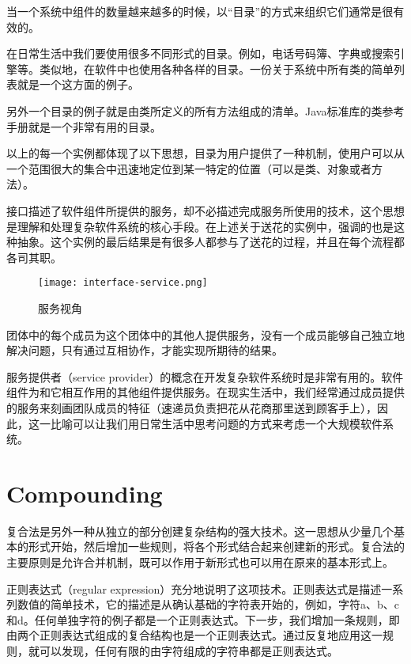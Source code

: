 当一个系统中组件的数量越来越多的时候，以“目录”的方式来组织它们通常是很有效的。

在日常生活中我们要使用很多不同形式的目录。例如，电话号码簿、字典或搜索引擎等。类似地，在软件中也使用各种各样的目录。一份关于系统中所有类的简单列表就是一个这方面的例子。

另外一个目录的例子就是由类所定义的所有方法组成的清单。Java标准库的类参考手册就是一个非常有用的目录。

以上的每一个实例都体现了以下思想，目录为用户提供了一种机制，使用户可以从一个范围很大的集合中迅速地定位到某一特定的位置（可以是类、对象或者方法）。


接口描述了软件组件所提供的服务，却不必描述完成服务所使用的技术，这个思想是理解和处理复杂软件系统的核心手段。在上述关于送花的实例中，强调的也是这种抽象。这个实例的最后结果是有很多人都参与了送花的过程，并且在每个流程都各司其职。

\begin{figure}[htbp]
\centering
\texttt{[image: interface-service.png]}
\caption{服务视角}
\label{fig:interface-service}
\end{figure}


团体中的每个成员为这个团体中的其他人提供服务，没有一个成员能够自己独立地解决问题，只有通过互相协作，才能实现所期待的结果。


服务提供者（service provider）的概念在开发复杂软件系统时是非常有用的。软件组件为和它相互作用的其他组件提供服务。在现实生活中，我们经常通过成员提供的服务来刻画团队成员的特征（速递员负责把花从花商那里送到顾客手上），因此，这一比喻可以让我们用日常生活中思考问题的方式来考虑一个大规模软件系统。



\section{Compounding}


复合法是另外一种从独立的部分创建复杂结构的强大技术。这一思想从少量几个基本的形式开始，然后增加一些规则，将各个形式结合起来创建新的形式。复合法的主要原则是允许合并机制，既可以作用于新形式也可以用在原来的基本形式上。

正则表达式（regular expression）充分地说明了这项技术。正则表达式是描述一系列数值的简单技术，它的描述是从确认基础的字符表开始的，例如，字符a、b、c和d。任何单独字符的例子都是一个正则表达式。下一步，我们增加一条规则，即由两个正则表达式组成的复合结构也是一个正则表达式。通过反复地应用这一规则，就可以发现，任何有限的由字符组成的字符串都是正则表达式。

